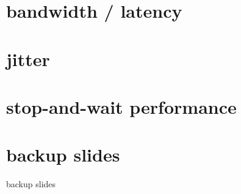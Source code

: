 \date{}
\title{}
\date{}

\begin{frame}
    \titlepage
\end{frame}



\section{bandwidth / latency}


\section{jitter}


\section{stop-and-wait performance}






\section{backup slides}
\begin{frame}{backup slides}
\end{frame}


